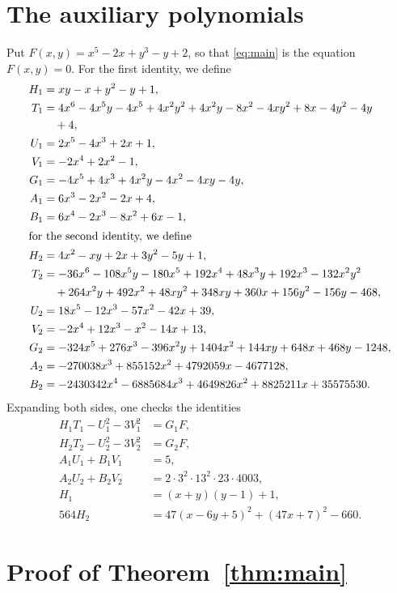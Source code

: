 \documentclass[11pt]{article}
\begin{document}
\section{The auxiliary polynomials}

Put $F(x,y)=x^{5}-2x+y^{3}-y+2$, so that \eqref{eq:main} is the equation $F(x,y)=0$.
For the first identity, we define
\begin{align*}
H_{1}&=xy-x+y^{2}-y+1,\\
T_{1}&=4x^{6}-4x^{5}y-4x^{5}+4x^{2}y^{2}+4x^{2}y-8x^{2}-4xy^{2}+8x-4y^{2}-4y\\
&\quad+4,\\
U_{1}&=2x^{5}-4x^{3}+2x+1,\\
V_{1}&=-2x^{4}+2x^{2}-1,\\
G_{1}&=-4x^{5}+4x^{3}+4x^{2}y-4x^{2}-4xy-4y,\\
A_{1}&=6x^{3}-2x^{2}-2x+4,\\
B_{1}&=6x^{4}-2x^{3}-8x^{2}+6x-1,\\
\intertext{for the second identity, we define}
H_{2}&=4x^{2}-xy+2x+3y^{2}-5y+1,\\
T_{2}&=-36x^{6}-108x^{5}y-180x^{5}+192x^{4}+48x^{3}y+192x^{3}-132x^{2}y^{2}\\
&\quad+264x^{2}y+492x^{2}+48xy^{2}+348xy+360x+156y^{2}-156y-468,\\
U_{2}&=18x^{5}-12x^{3}-57x^{2}-42x+39,\\
V_{2}&=-2x^{4}+12x^{3}-x^{2}-14x+13,\\
G_{2}&=-324x^{5}+276x^{3}-396x^{2}y+1404x^{2}+144xy+648x+468y-1248,\\
A_{2}&=-270038x^{3}+855152x^{2}+4792059x-4677128,\\
B_{2}&=-2430342x^{4}-6885684x^{3}+4649826x^{2}+8825211x+35575530.
\end{align*}
Expanding both sides, one checks the identities
\begin{align}
H_{1}T_{1}-U_{1}^2-3V_{1}^2&=G_{1}F,\label{eq:norm1}\\
H_{2}T_{2}-U_{2}^2-3V_{2}^2&=G_{2}F,\label{eq:norm2}\\
A_{1}U_{1}+B_{1}V_{1}&=5,\label{eq:bez1}\\
A_{2}U_{2}+B_{2}V_{2}&=2\cdot 3^{2}\cdot 13^{2}\cdot 23\cdot 4003,\label{eq:bez2}\\
H_{1}&=(x+y)(y-1)+1,\label{eq:sign1}\\
564H_{2}&=47(x-6y+5)^2+(47x+7)^2-660.\label{eq:sign2}
\end{align}

\section{Proof of Theorem~\ref{thm:main}}
\end{document}
